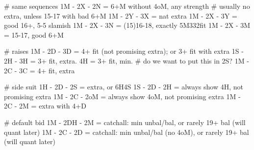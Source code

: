 # same sequences
1M - 2X - 2N = 6+M without 4oM, any strength  # usually no extra, unless 15-17 with bad 6+M
1M - 2Y - 3X = nat extra
1M - 2X - 3Y = good 16+, 5-5 slamish
1M - 2X - 3N = (15)16-18, exactly 5M332fit
1M - 2X - 3M = 15-17, good 6+M

# raises
1M - 2D - 3D = 4+ fit (not promising extra); or 3+ fit with extra
1S - 2H - 3H = 3+ fit, extra. 4H = 3+ fit, min.  # do we want to put this in 2S?
1M - 2C - 3C = 4+ fit, extra

# side suit
1H - 2D - 2S = extra, or 6H4S
1S - 2D - 2H = always show 4H, not promising extra
1M - 2C - 2oM = always show 4oM, not promising extra
1M - 2C - 2M = extra with 4+D

# default bid
1M - 2DH - 2M = catchall: min unbal/bal, or rarely 19+ bal (will quant later)
1M - 2C - 2D = catchall: min unbal/bal (no 4oM), or rarely 19+ bal (will quant later)
